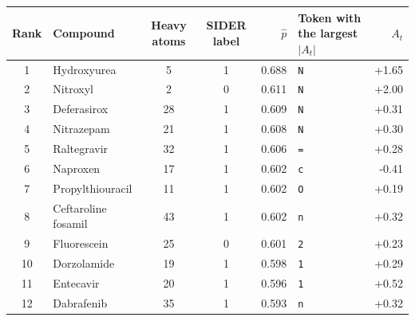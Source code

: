 \begin{tabular}{clccrlr}
\toprule
Rank & Compound & Heavy atoms & SIDER label & $\hat{p}$ & Token with the largest $|A_t|$ & $A_t$ \\
\midrule
1 & Hydroxyurea & 5 & 1 & 0.688 & \texttt{N} & +1.65 \\
2 & Nitroxyl & 2 & 0 & 0.611 & \texttt{N} & +2.00 \\
3 & Deferasirox & 28 & 1 & 0.609 & \texttt{N} & +0.31 \\
4 & Nitrazepam & 21 & 1 & 0.608 & \texttt{N} & +0.30 \\
5 & Raltegravir & 32 & 1 & 0.606 & \texttt{=} & +0.28 \\
6 & Naproxen & 17 & 1 & 0.602 & \texttt{c} & -0.41 \\
7 & Propylthiouracil & 11 & 1 & 0.602 & \texttt{O} & +0.19 \\
8 & Ceftaroline fosamil & 43 & 1 & 0.602 & \texttt{n} & +0.32 \\
9 & Fluorescein & 25 & 0 & 0.601 & \texttt{2} & +0.23 \\
10 & Dorzolamide & 19 & 1 & 0.598 & \texttt{1} & +0.29 \\
11 & Entecavir & 20 & 1 & 0.596 & \texttt{1} & +0.52 \\
12 & Dabrafenib & 35 & 1 & 0.593 & \texttt{n} & +0.32 \\
\bottomrule
\end{tabular}